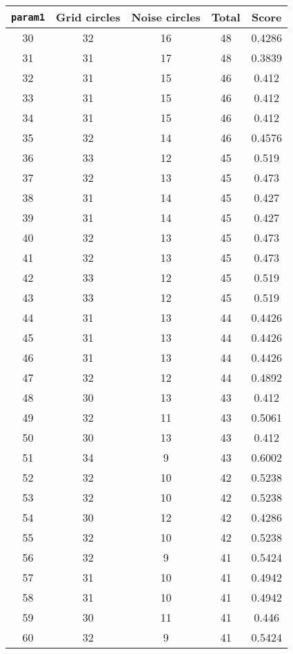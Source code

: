 \documentclass[letterpaper, 12pt]{article}
\begin{document}
\begin{longtable}{|c|c|c|c|c|}
\hline
\textbf{\texttt{param1}} & \textbf{Grid circles} & \textbf{Noise circles} & \textbf{Total} & \textbf{Score} \\
\hline
30 & 32 & 16 & 48 & 0.4286 \\
\hline
31 & 31 & 17 & 48 & 0.3839 \\
\hline
32 & 31 & 15 & 46 & 0.412 \\
\hline
33 & 31 & 15 & 46 & 0.412 \\
\hline
34 & 31 & 15 & 46 & 0.412 \\
\hline
35 & 32 & 14 & 46 & 0.4576 \\
\hline
36 & 33 & 12 & 45 & 0.519 \\
\hline
37 & 32 & 13 & 45 & 0.473 \\
\hline
38 & 31 & 14 & 45 & 0.427 \\
\hline
39 & 31 & 14 & 45 & 0.427 \\
\hline
40 & 32 & 13 & 45 & 0.473 \\
\hline
41 & 32 & 13 & 45 & 0.473 \\
\hline
42 & 33 & 12 & 45 & 0.519 \\
\hline
43 & 33 & 12 & 45 & 0.519 \\
\hline
44 & 31 & 13 & 44 & 0.4426 \\
\hline
45 & 31 & 13 & 44 & 0.4426 \\
\hline
46 & 31 & 13 & 44 & 0.4426 \\
\hline
47 & 32 & 12 & 44 & 0.4892 \\
\hline
48 & 30 & 13 & 43 & 0.412 \\
\hline
49 & 32 & 11 & 43 & 0.5061 \\
\hline
50 & 30 & 13 & 43 & 0.412 \\
\hline
51 & 34 & 9 & 43 & 0.6002 \\
\hline
52 & 32 & 10 & 42 & 0.5238 \\
\hline
53 & 32 & 10 & 42 & 0.5238 \\
\hline
54 & 30 & 12 & 42 & 0.4286 \\
\hline
55 & 32 & 10 & 42 & 0.5238 \\
\hline
56 & 32 & 9 & 41 & 0.5424 \\
\hline
57 & 31 & 10 & 41 & 0.4942 \\
\hline
58 & 31 & 10 & 41 & 0.4942 \\
\hline
59 & 30 & 11 & 41 & 0.446 \\
\hline
60 & 32 & 9 & 41 & 0.5424 \\
\hline

\end{longtable}
\end{document}
